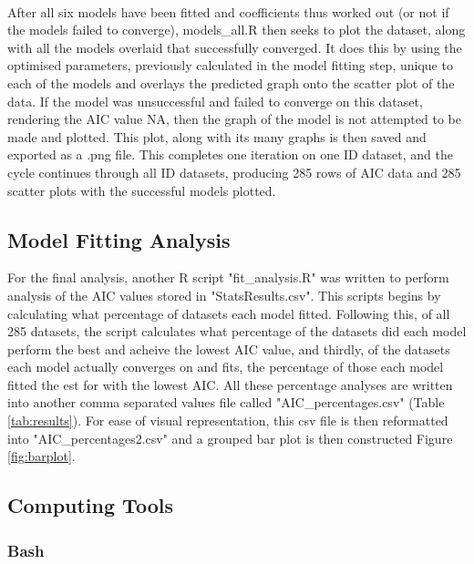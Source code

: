 \documentclass[11pt, a4paper]{article} %
\begin{document}
\paragraph{} After all six models have been fitted and coefficients thus worked out (or not if the models failed to converge), models\_all.R then seeks to plot the dataset, along with all the models overlaid that successfully converged. It does this by using the optimised parameters, previously calculated in the model fitting step, unique to each of the models and overlays the predicted graph onto the scatter plot of the data. If the model was unsuccessful and failed to converge on this dataset, rendering the AIC value NA, then the graph of the model is not attempted to be made and plotted. This plot, along with its many graphs is then saved and exported as a .png file. This completes one iteration on one ID dataset, and the cycle continues through all ID datasets, producing 285 rows of AIC data and 285 scatter plots with the successful models plotted.

\subsection{Model Fitting Analysis}

For the final analysis, another R script "fit\_analysis.R" was written to perform analysis of the AIC values stored in "StatsResults.csv". This scripts begins by calculating what percentage of datasets each model fitted. Following this, of all 285 datasets, the script calculates what percentage of the datasets did each model perform the best and acheive the lowest AIC value, and thirdly, of the datasets each model actually converges on and fits, the percentage of those each model fitted the est for with the lowest AIC. All these percentage analyses are written into another comma separated values file called "AIC\_percentages.csv" (Table \ref{tab:results}). For ease of visual representation, this csv file is then reformatted into "AIC\_percentages2.csv" and a grouped bar plot is then constructed Figure \ref{fig:barplot}. 

\subsection{Computing Tools}

\subsubsection{Bash}
\end{document}
